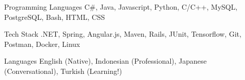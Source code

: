 

\begin{cvskills}

  \cvskill
    {Programming Languages} %
    {C\#, Java, Javascript, Python, C/C++, MySQL, PostgreSQL, Bash, HTML, CSS} %

  \cvskill
    {Tech Stack} %
    {.NET, Spring, Angular.js, Maven, Rails, JUnit, Tensorflow, Git, Postman, Docker, Linux} %

  \cvskill
    {Languages} %
    {English (Native), Indonesian (Professional), Japanese (Conversational), Turkish (Learning!)} %

\end{cvskills}
